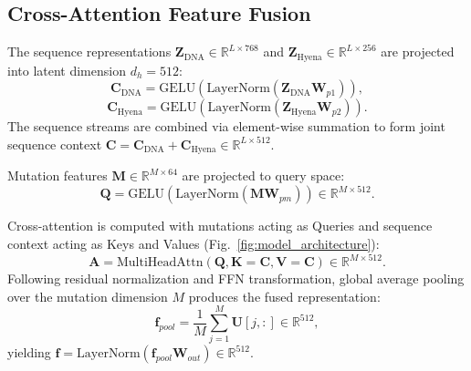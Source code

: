 \documentclass[conference]{IEEEtran}
\begin{document}
\subsection{Cross-Attention Feature Fusion}
The sequence representations $\mathbf{Z}_{\text{DNA}} \in \mathbb{R}^{L \times 768}$ and $\mathbf{Z}_{\text{Hyena}} \in \mathbb{R}^{L \times 256}$ are projected into latent dimension $d_h = 512$:
\begin{equation}
\mathbf{C}_{\text{DNA}} = \text{GELU}(\text{LayerNorm}(\mathbf{Z}_{\text{DNA}} \mathbf{W}_{p1})),
\label{eq:proj_dna}
\end{equation}
\begin{equation}
\mathbf{C}_{\text{Hyena}} = \text{GELU}(\text{LayerNorm}(\mathbf{Z}_{\text{Hyena}} \mathbf{W}_{p2})).
\label{eq:proj_hyena}
\end{equation}
The sequence streams are combined via element-wise summation to form joint sequence context $\mathbf{C} = \mathbf{C}_{\text{DNA}} + \mathbf{C}_{\text{Hyena}} \in \mathbb{R}^{L \times 512}$.

Mutation features $\mathbf{M} \in \mathbb{R}^{M \times 64}$ are projected to query space:
\begin{equation}
\mathbf{Q} = \text{GELU}(\text{LayerNorm}(\mathbf{M} \mathbf{W}_{pm})) \in \mathbb{R}^{M \times 512}.
\label{eq:proj_mut}
\end{equation}

Cross-attention is computed with mutations acting as Queries and sequence context acting as Keys and Values (Fig.~\ref{fig:model_architecture}):
\begin{equation}
\mathbf{A} = \text{MultiHeadAttn}(\mathbf{Q}, \mathbf{K}=\mathbf{C}, \mathbf{V}=\mathbf{C}) \in \mathbb{R}^{M \times 512}.
\label{eq:cross_attn}
\end{equation}
Following residual normalization and FFN transformation, global average pooling over the mutation dimension $M$ produces the fused representation:
\begin{equation}
\mathbf{f}_{pool} = \frac{1}{M} \sum_{j=1}^M \mathbf{U}[j, :] \in \mathbb{R}^{512},
\label{eq:global_pool}
\end{equation}
yielding $\mathbf{f} = \text{LayerNorm}(\mathbf{f}_{pool} \mathbf{W}_{out}) \in \mathbb{R}^{512}$.
\end{document}
